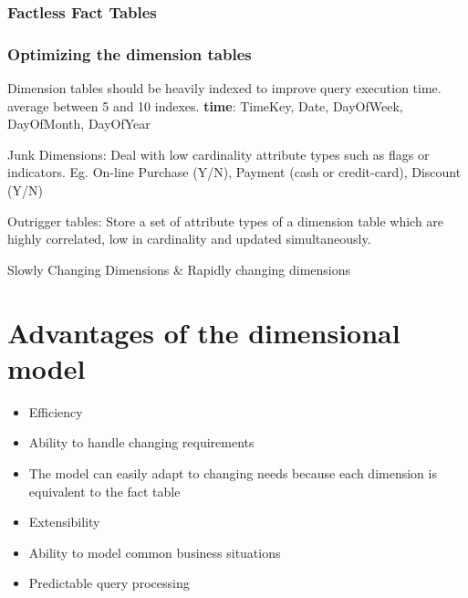 \documentclass{report}
\begin{document}
	\subsubsection{Factless Fact Tables}
	\subsubsection{Optimizing the dimension tables}
	Dimension tables should be heavily indexed to improve query execution time. average between 5 and 10 indexes. \textbf{time}: TimeKey, Date, DayOfWeek, DayOfMonth, DayOfYear
	
	Junk Dimensions: Deal with low cardinality attribute types such as flags or indicators. Eg. On-line Purchase (Y/N), Payment (cash or credit-card), Discount (Y/N)
	
	Outrigger tables: Store a set of attribute types of a dimension table which are highly correlated, low in cardinality and updated simultaneously.
	
	Slowly Changing Dimensions \& Rapidly changing dimensions
	
	\section{Advantages of the dimensional model}
	\begin{itemize}
		\item Efficiency
		\item Ability to handle changing requirements
		\item The model can easily adapt to changing needs because each dimension is equivalent to the fact table
		\item Extensibility
		\item Ability to model common business situations
		\item Predictable query processing
	\end{itemize}
	
	
\end{document}
